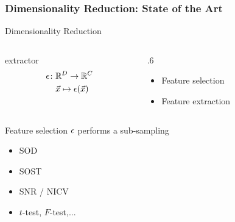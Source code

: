 \begin{frame}
\frametitle{Dimensionality Reduction: State of the Art}
\begin{block}{Dimensionality Reduction}
\begin{columns}

\begin{column}{.3\textwidth}
\centering extractor  \begin{align*}
\epsilon \colon & \mathbb{R}^D\rightarrow \mathbb{R}^C\\
& \vec{x} \mapsto \epsilon(\vec{x})
\end{align*}

\end{column}
\begin{column} {.6\textwidth}
\begin{itemize}
\item Feature selection 
\item Feature extraction
\end{itemize}
\end{column}

\end{columns}
\end{block}
\begin{columns}

\begin{column}{.4\textwidth}
\begin{block}{Feature selection}
$\epsilon$ performs a sub-sampling
\begin{itemize}
\item SOD \cite{Chari2003}
\item SOST \cite{bar2010improved}
\item SNR \cite{mangard2008power}/ NICV \cite{bhasin2014side}
\item $t$-test, $F$-test,... \cite{gierlichs2006templates,choudary2014efficient}
\end{itemize}
\end{block}
\end{column}

\begin{column}{.6\textwidth}
\end{column}
\end{columns}
\end{frame}
